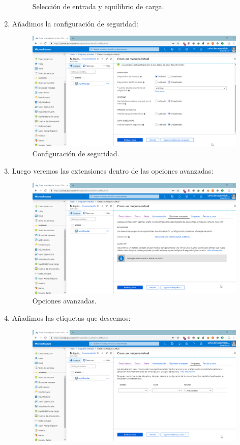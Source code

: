 \begin{enumerate}
\begin{figure}[h]
		\caption{Selección de entrada y equilibrio de carga.}
		\label{Selección de entrada y equilibrio de carga}
	\end{figure}
	\item Añadimos la configuración de seguridad:
	\begin{figure}[h]
		\centering
		\includegraphics[scale=0.35]{ImagenesAzure/MV/7.png}
		\caption{Configuración de seguridad.}
		\label{Configuración de seguridad}
	\end{figure}
\newpage
	\item Luego veremos las extensiones dentro de las opciones avanzadas:
	\begin{figure}[h]
		\centering
		\includegraphics[scale=0.35]{ImagenesAzure/MV/8.png}
		\caption{Opciones avanzadas.}
		\label{Opciones avanzadas}
	\end{figure}
	\item Añadimos las etiquetas que deseemos:
	\begin{figure}[h]
		\centering
		\includegraphics[scale=0.35]{ImagenesAzure/MV/9.png}

\end{figure}
\end{enumerate}
